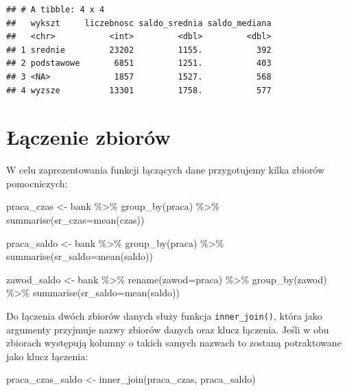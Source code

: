 \documentclass[
]{book}
\newenvironment{Shaded}{\begin{snugshade}}{\end{snugshade}}
\newcommand{\AttributeTok}[1]{\textcolor[rgb]{0.77,0.63,0.00}{#1}}
\newcommand{\FunctionTok}[1]{\textcolor[rgb]{0.00,0.00,0.00}{#1}}
\newcommand{\NormalTok}[1]{#1}
\newcommand{\OtherTok}[1]{\textcolor[rgb]{0.56,0.35,0.01}{#1}}
\newcommand{\SpecialCharTok}[1]{\textcolor[rgb]{0.00,0.00,0.00}{#1}}
\begin{document}
\begin{verbatim}
## # A tibble: 4 x 4
##   wykszt     liczebnosc saldo_srednia saldo_mediana
##   <chr>           <int>         <dbl>         <dbl>
## 1 srednie         23202         1155.           392
## 2 podstawowe       6851         1251.           403
## 3 <NA>             1857         1527.           568
## 4 wyzsze          13301         1758.           577
\end{verbatim}

\hypertarget{ux142ux105czenie-zbioruxf3w}{%
\section{Łączenie zbiorów}\label{ux142ux105czenie-zbioruxf3w}}

W celu zaprezentowania funkcji łączących dane przygotujemy kilka zbiorów pomocniczych:

\begin{Shaded}
\begin{Highlighting}[]
\NormalTok{praca\_czas }\OtherTok{\textless{}{-}}\NormalTok{ bank }\SpecialCharTok{\%\textgreater{}\%}
  \FunctionTok{group\_by}\NormalTok{(praca) }\SpecialCharTok{\%\textgreater{}\%}
  \FunctionTok{summarise}\NormalTok{(}\AttributeTok{sr\_czas=}\FunctionTok{mean}\NormalTok{(czas))}

\NormalTok{praca\_saldo }\OtherTok{\textless{}{-}}\NormalTok{ bank }\SpecialCharTok{\%\textgreater{}\%}
  \FunctionTok{group\_by}\NormalTok{(praca) }\SpecialCharTok{\%\textgreater{}\%}
  \FunctionTok{summarise}\NormalTok{(}\AttributeTok{sr\_saldo=}\FunctionTok{mean}\NormalTok{(saldo))}

\NormalTok{zawod\_saldo }\OtherTok{\textless{}{-}}\NormalTok{ bank }\SpecialCharTok{\%\textgreater{}\%}
  \FunctionTok{rename}\NormalTok{(}\AttributeTok{zawod=}\NormalTok{praca) }\SpecialCharTok{\%\textgreater{}\%}
  \FunctionTok{group\_by}\NormalTok{(zawod) }\SpecialCharTok{\%\textgreater{}\%}
  \FunctionTok{summarise}\NormalTok{(}\AttributeTok{sr\_saldo=}\FunctionTok{mean}\NormalTok{(saldo))}
\end{Highlighting}
\end{Shaded}

Do łączenia dwóch zbiorów danych służy funkcja \texttt{inner\_join()}, która jako argumenty przyjmuje nazwy zbiorów danych oraz klucz łączenia. Jeśli w obu zbiorach występują kolumny o takich samych nazwach to zostaną potraktowane jako klucz łączenia:

\begin{Shaded}
\begin{Highlighting}[]
\NormalTok{praca\_czas\_saldo }\OtherTok{\textless{}{-}} \FunctionTok{inner\_join}\NormalTok{(praca\_czas, praca\_saldo)}
\end{Highlighting}
\end{Shaded}
\end{document}

